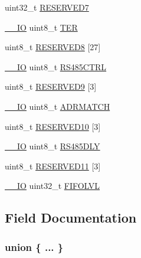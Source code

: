 \begin{DoxyCompactItemize}
uint32\+\_\+t \hyperlink{structLPC__UART1__TypeDef_a9c622423d4dd140aaea690645b0c3702}{R\+E\+S\+E\+R\+V\+E\+D7}
\item 
\hyperlink{LPC17xx_8h_aec43007d9998a0a0e01faede4133d6be}{\+\_\+\+\_\+\+IO} uint8\+\_\+t \hyperlink{structLPC__UART1__TypeDef_ae1d0d37313543a6e6c365c86763ed79b}{T\+ER}
\item 
uint8\+\_\+t \hyperlink{structLPC__UART1__TypeDef_a193b2ce04d2e6cd7ce5fc412631010dd}{R\+E\+S\+E\+R\+V\+E\+D8} \mbox{[}27\mbox{]}
\item 
\hyperlink{LPC17xx_8h_aec43007d9998a0a0e01faede4133d6be}{\+\_\+\+\_\+\+IO} uint8\+\_\+t \hyperlink{structLPC__UART1__TypeDef_a916353b71cb3ec061b2eef4c9f8eaf68}{R\+S485\+C\+T\+RL}
\item 
uint8\+\_\+t \hyperlink{structLPC__UART1__TypeDef_a772cb11083349e05366b7c3047f6f52f}{R\+E\+S\+E\+R\+V\+E\+D9} \mbox{[}3\mbox{]}
\item 
\hyperlink{LPC17xx_8h_aec43007d9998a0a0e01faede4133d6be}{\+\_\+\+\_\+\+IO} uint8\+\_\+t \hyperlink{structLPC__UART1__TypeDef_aa9eac9205cc4503b0447d7dbd1742f88}{A\+D\+R\+M\+A\+T\+CH}
\item 
uint8\+\_\+t \hyperlink{structLPC__UART1__TypeDef_abd398f69dcfbbe91c8d13bf4a4449ae3}{R\+E\+S\+E\+R\+V\+E\+D10} \mbox{[}3\mbox{]}
\item 
\hyperlink{LPC17xx_8h_aec43007d9998a0a0e01faede4133d6be}{\+\_\+\+\_\+\+IO} uint8\+\_\+t \hyperlink{structLPC__UART1__TypeDef_ab89d9a8dbf2a31a1e3bf84326f5a4933}{R\+S485\+D\+LY}
\item 
uint8\+\_\+t \hyperlink{structLPC__UART1__TypeDef_afe8aff2c027ff9b686ce9ffb549fd11e}{R\+E\+S\+E\+R\+V\+E\+D11} \mbox{[}3\mbox{]}
\item 
\hyperlink{LPC17xx_8h_aec43007d9998a0a0e01faede4133d6be}{\+\_\+\+\_\+\+IO} uint32\+\_\+t \hyperlink{structLPC__UART1__TypeDef_a7e2097acda098342017d27a3d12a9e99}{F\+I\+F\+O\+L\+VL}
\end{DoxyCompactItemize}


\subsection{Field Documentation}
\subsubsection[{\texorpdfstring{"@46}{@46}}]{\setlength{\rightskip}{0pt plus 5cm}union \{ ... \} }\hypertarget{structLPC__UART1__TypeDef_a7d67192daf51b873b59905a3e2db8f01}{}\label{structLPC__UART1__TypeDef_a7d67192daf51b873b59905a3e2db8f01}
